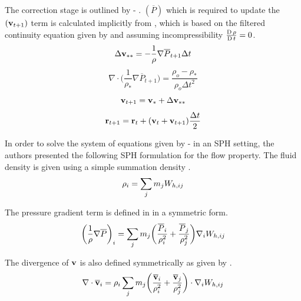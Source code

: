 The correction stage is outlined by  - . $(\overline{P})$ which is required to update the $(\mathbf{v}_{t+1})$ term is calculated implicitly from , which is based on the filtered continuity equation given by  and assuming incompressibility $\frac{\operatorname{D} \rho}{\operatorname{D} t}=0$.
\begin{equation}
    \Delta \mathbf{v}_{**} = -\frac{1}{\rho} \nabla \overline{P}_{t+1} \Delta t
    \label{eq:Gotoh2004-correct-start}
\end{equation}
\begin{equation}
    \nabla \cdot \bigg( \frac{1}{\rho_*} \nabla \overline{P}_{t+1} \bigg) = \frac{\rho_o - \rho_*}{\rho_o \Delta t^2}
    \label{eq:Gotoh2004-correct-pressure-implicit}
\end{equation}
\begin{equation}
    \mathbf{v}_{t+1} = \mathbf{v}_* + \Delta \mathbf{v}_{**}
\end{equation}
\begin{equation}
    \mathbf{r}_{t+1} = \mathbf{r}_t + (\mathbf{v}_t + \mathbf{v}_{t+1})\frac{\Delta t}{2}
    \label{eq:Gotoh2004-correct-end}
\end{equation}

In order to solve the system of equations given by  -  in an SPH setting, the authors presented the following SPH formulation for the flow property. The fluid density is given using a simple summation density .
\begin{equation}
    \rho_i = \sum_j m_jW_{h, ij}
    \label{eq:Gotoh2004-summation-density}
\end{equation}

The pressure gradient term is defined in  in a symmetric form.
\begin{equation}
    \bigg( \frac{1}{\rho} \nabla \overline{P} \bigg)_i = \sum_j m_j \bigg( \frac{\overline{P}_i}{\rho_i^2} + \frac{\overline{P}_j}{\rho_j^2} \bigg) \nabla_{i} W_{h, ij}
    \label{eq:Gotoh2004-grad-p-sph}
\end{equation}

The divergence of $\mathbf{v}$ is also defined symmetrically as given by .
\begin{equation}
    \nabla \cdot \mathbf{\overline{v}}_i = \rho_i \sum_j m_j \bigg(\frac{\mathbf{\overline{v}}_i}{\rho^2_i} + \frac{\mathbf{\overline{v}}_j}{\rho^2_j} \bigg) \cdot \nabla_{i} W_{h, ij}
    \label{eq:Gotoh2004-div-u-sph}
\end{equation}


